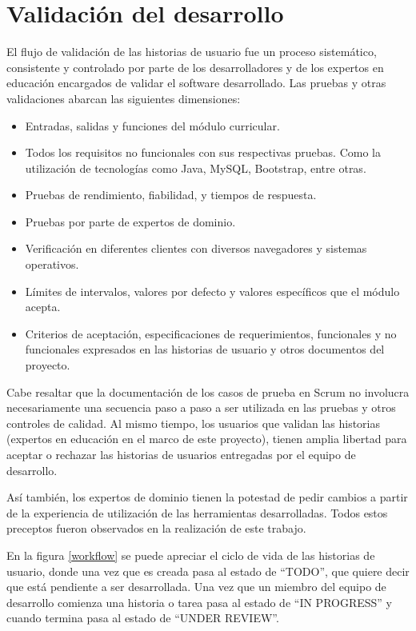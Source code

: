 
\chapter{Validación del desarrollo} \label{capitulo6}
El flujo de validación de las historias de usuario fue un proceso sistemático, consistente y controlado por parte de los desarrolladores y de los expertos en educación encargados de validar el software desarrollado. Las pruebas y otras validaciones abarcan las siguientes dimensiones:
\begin{itemize}
	\item Entradas, salidas y funciones del módulo curricular.
	\item Todos los requisitos no funcionales con sus respectivas pruebas. Como la utilización de tecnologías como Java, MySQL, Bootstrap, entre otras.
	\item Pruebas de rendimiento, fiabilidad, y tiempos de respuesta.
	\item Pruebas por parte de expertos de dominio.
	\item Verificación en diferentes clientes con diversos navegadores y sistemas operativos.
	\item Límites de intervalos, valores por defecto y valores específicos que el módulo acepta.
	\item Criterios de aceptación, especificaciones de requerimientos, funcionales y no funcionales expresados en las historias de usuario y otros documentos del proyecto.
\end{itemize}

Cabe resaltar que la documentación de los casos de prueba en Scrum no involucra necesariamente una secuencia paso a paso a ser utilizada en las pruebas y otros controles de calidad. Al mismo tiempo, los usuarios que validan las historias (expertos en educación en el marco de este proyecto), tienen amplia libertad para aceptar o rechazar las historias de usuarios entregadas por el equipo de desarrollo. 

Así también, los expertos de dominio tienen la potestad de pedir cambios a partir de la experiencia de utilización de las herramientas desarrolladas. Todos estos preceptos fueron observados en la realización de este trabajo.

En la figura \ref{workflow} se puede apreciar el ciclo de vida de las historias de usuario, donde una vez que es creada pasa al estado de \enquote{TODO}, que quiere decir que está pendiente a ser desarrollada. Una vez que un miembro del equipo de desarrollo comienza una historia o tarea pasa al estado de \enquote{IN PROGRESS} y cuando termina pasa al estado de \enquote{UNDER REVIEW}. 

